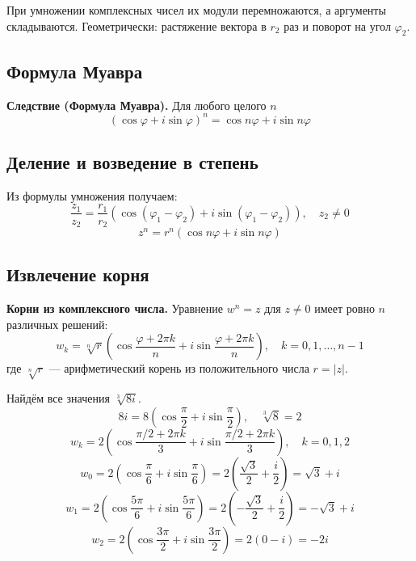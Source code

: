 \documentclass[a4paper,12pt]{article}
\theoremstyle{definition}
\theoremstyle{plain}
\theoremstyle{remark}
\begin{document}
	\begin{tcolorbox}[colback=blue!5, colframe=blue!40!black, title=Геометрический смысл]
		При умножении комплексных чисел их модули перемножаются, а аргументы складываются. Геометрически: растяжение вектора в $r_2$ раз и поворот на угол $\varphi_2$.
	\end{tcolorbox}
	
	\subsection{Формула Муавра}
	
	\noindent \textbf{Следствие (Формула Муавра).}
	Для любого целого $n$
	\[
	(\cos \varphi + i \sin \varphi)^n = \cos n\varphi + i \sin n\varphi
	\]
	
	\subsection{Деление и возведение в степень}
	
	Из формулы умножения получаем:
	\[
	\frac{z_1}{z_2} = \frac{r_1}{r_2} (\cos(\varphi_1 - \varphi_2) + i \sin(\varphi_1 - \varphi_2)),\quad z_2 \neq 0
	\]
	\[
	z^n = r^n (\cos n\varphi + i \sin n\varphi)
	\]
	
	\subsection{Извлечение корня}
	
	\noindent \textbf{Корни из комплексного числа.}
	Уравнение $w^n = z$ для $z \neq 0$ имеет ровно $n$ различных решений:
	\[
	w_k = \sqrt[n]{r} \left( \cos\frac{\varphi + 2\pi k}{n} + i \sin\frac{\varphi + 2\pi k}{n} \right),\quad k = 0, 1, \dots, n-1
	\]
	где $\sqrt[n]{r}$ — арифметический корень из положительного числа $r = |z|$.
	
	\begin{tcolorbox}[colback=gray!5, colframe=gray!50, title=Пример]
		Найдём все значения $\sqrt[3]{8i}$.
		\[
		8i = 8\left(\cos\frac{\pi}{2} + i \sin\frac{\pi}{2}\right),\quad \sqrt[3]{8} = 2
		\]
		\[
		w_k = 2\left(\cos\frac{\pi/2 + 2\pi k}{3} + i \sin\frac{\pi/2 + 2\pi k}{3}\right),\quad k = 0,1,2
		\]
		\[
		w_0 = 2\left(\cos\frac{\pi}{6} + i \sin\frac{\pi}{6}\right) = 2\left(\frac{\sqrt{3}}{2} + \frac{i}{2}\right) = \sqrt{3} + i
		\]
		\[
		w_1 = 2\left(\cos\frac{5\pi}{6} + i \sin\frac{5\pi}{6}\right) = 2\left(-\frac{\sqrt{3}}{2} + \frac{i}{2}\right) = -\sqrt{3} + i
		\]
		\[
		w_2 = 2\left(\cos\frac{3\pi}{2} + i \sin\frac{3\pi}{2}\right) = 2(0 - i) = -2i
		\]
	\end{tcolorbox}
	
\end{document}
